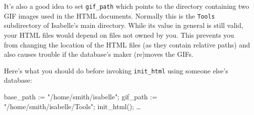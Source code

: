 It's also a good idea to set {\tt gif_path} which points to the
directory containing two GIF images used in the HTML
documents. Normally this is the {\tt Tools} subdirectory of Isabelle's
main directory. While its value in general is still valid, your HTML
files would depend on files not owned by you. This prevents you from
changing the location of the HTML files (as they contain relative
paths) and also causes trouble if the database's maker (re)moves the
GIFs.

Here's what you should do before invoking {\tt init_html} using
someone else's \ML{} database:

\begin{ttbox}
base_path := "/home/smith/isabelle";
gif_path := "/home/smith/isabelle/Tools";
init_html();
\dots
\end{ttbox}

